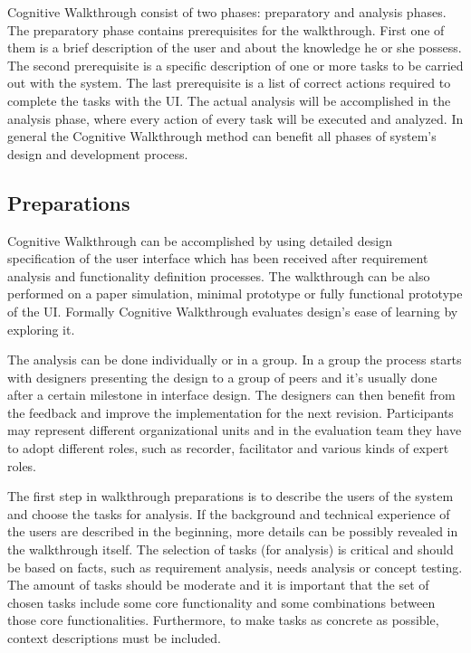 \documentclass[12pt,a4paper,oneside,pdftex]{report}
\begin{document}
Cognitive Walkthrough consist of two phases: preparatory and analysis phases. The preparatory phase contains prerequisites for the walkthrough. First one of them is a brief description of the user and about the knowledge he or she possess. The second prerequisite is a specific description of one or more tasks to be carried out with the system. The last prerequisite is a list of correct actions required to complete the tasks with the UI. The actual analysis will be accomplished in the analysis phase, where every action of every task will be executed and analyzed. In general the Cognitive Walkthrough method can benefit all phases of system's design and development process.\cite{RefWorks:26, RefWorks:34}

\subsection{Preparations}
Cognitive Walkthrough can be accomplished by using detailed design specification of the user interface which has been received after requirement analysis and functionality definition processes. The walkthrough can be also performed  on a paper simulation, minimal prototype or fully functional prototype of the UI. Formally Cognitive Walkthrough evaluates design's ease of learning by exploring it. \cite{RefWorks:26}

The analysis can be done individually or in a group. In a group the process starts with designers presenting the design to a group of peers and it's usually done after a certain milestone in interface design. The designers can then benefit from the feedback and improve the implementation for the next revision. Participants may represent different organizational units and in the evaluation team they have to adopt different roles, such as recorder, facilitator and various kinds of expert roles. \cite{RefWorks:26}

The first step in walkthrough preparations is to describe the users of the system and choose the tasks for analysis. If the background and technical experience of the users are described in the beginning, more details can be possibly revealed in the walkthrough itself. The selection of tasks (for analysis) is critical and should be based on facts, such as requirement analysis, needs analysis or concept testing. The amount of tasks should be moderate and it is important that the set of chosen tasks include some core functionality and some combinations between those core functionalities. Furthermore, to make tasks as concrete as possible, context descriptions must be included. \cite{RefWorks:26}
\end{document}
